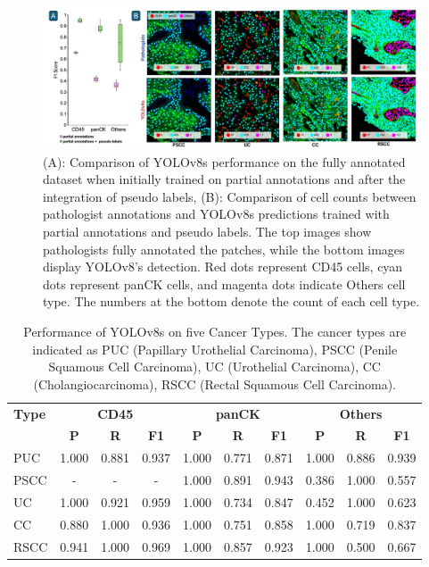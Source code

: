 \documentclass{midl} %
\begin{document}
\begin{figure}[!htbp]
\centering
\includegraphics[width=1\linewidth]{images/3.png}
\caption{(A): Comparison of YOLOv8s performance on the fully annotated dataset when initially trained on partial annotations and after the integration of pseudo labels, (B): Comparison of cell counts between pathologist annotations and YOLOv8s predictions trained with partial annotations and pseudo labels. The top images show pathologists fully annotated the patches, while the bottom images display YOLOv8's detection. Red dots represent CD45 cells, cyan dots represent panCK cells, and magenta dots indicate Others cell type. The numbers at the bottom denote the count of each cell type.}
\label{fig:cc_comparison}
\end{figure}

\begin{table}[!htbp]
\setlength{\abovecaptionskip}{2pt} 
\centering
\caption{Performance of YOLOv8s on five Cancer Types. The cancer types are indicated as PUC (Papillary Urothelial Carcinoma), PSCC (Penile Squamous Cell Carcinoma), UC (Urothelial Carcinoma), CC (Cholangiocarcinoma), RSCC (Rectal Squamous Cell Carcinoma).}%
  \begin{tabular}{l|ccc|ccc|ccc}
  \toprule
  \bfseries Type & \multicolumn{3}{c|}{\bfseries CD45} & \multicolumn{3}{c|}{\bfseries panCK} & \multicolumn{3}{c}{\bfseries Others}\\
  & \bfseries P & \bfseries R & \bfseries F1 & \bfseries P & \bfseries R & \bfseries F1 & \bfseries P & \bfseries R & \bfseries F1\\
  PUC & 1.000 & 0.881 & 0.937 & 1.000 & 0.771 & 0.871 & 1.000 & 0.886 & 0.939\\
  PSCC & - & - & - & 1.000 & 0.891 & 0.943 & 0.386 & 1.000 & 0.557\\
  UC & 1.000 & 0.921 & 0.959 & 1.000 & 0.734 & 0.847 & 0.452 & 1.000 & 0.623\\
  CC & 0.880 & 1.000 & 0.936 & 1.000 & 0.751 & 0.858 & 1.000 & 0.719 & 0.837\\
  RSCC & 0.941 & 1.000 & 0.969 & 1.000 & 0.857 & 0.923 & 1.000 & 0.500 & 0.667\\
  \bottomrule
  \end{tabular}
  \label{tab:cancer_validation}
\end{table}
\vspace{-1em}
\end{document}
